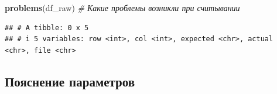 \documentclass[
]{article}
\newenvironment{Shaded}{\begin{snugshade}}{\end{snugshade}}
\newcommand{\CommentTok}[1]{\textcolor[rgb]{0.56,0.35,0.01}{\textit{#1}}}
\newcommand{\FunctionTok}[1]{\textcolor[rgb]{0.13,0.29,0.53}{\textbf{#1}}}
\newcommand{\NormalTok}[1]{#1}
\begin{document}
\begin{Shaded}
\begin{Highlighting}[]
\FunctionTok{problems}\NormalTok{(df\_raw) }\CommentTok{\# Какие проблемы возникли при считывании}
\end{Highlighting}
\end{Shaded}

\begin{verbatim}
## # A tibble: 0 x 5
## # i 5 variables: row <int>, col <int>, expected <chr>, actual <chr>, file <chr>
\end{verbatim}

\subsection{Пояснение
параметров}\label{ux43fux43eux44fux441ux43dux435ux43dux438ux435-ux43fux430ux440ux430ux43cux435ux442ux440ux43eux432}
\end{document}
